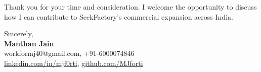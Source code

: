 \documentclass[letterpaper,10pt]{article}
\begin{document}
\vspace{5pt}
Thank you for your time and consideration. I welcome the opportunity to discuss how I can contribute to SeekFactory's commercial expansion across India.

\vspace{8pt}
Sincerely, \\[8pt]
\textbf{Manthan Jain} \\
\small
workformj40@gmail.com, +91-6000074846 \\
\href{https://www.linkedin.com/in/mjf0rti}{linkedin.com/in/mjf0rti}, \href{https://github.com/MJforti}{github.com/MJforti}
\end{document}

